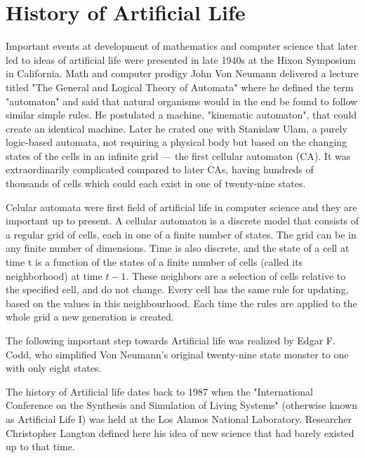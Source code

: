 \documentclass[a4paper,12pt]{report}
\begin{document}
\section{History of Artificial Life}

Important events at development of mathematics and computer science that later led to ideas of artificial life were presented in late 1940s at the Hixon Symposium in California. Math and computer prodigy John Von Neumann delivered a lecture titled "The General and Logical Theory of Automata" where he defined the term "automaton" and said that natural organisms would in the end be found to follow similar simple rules. He postulated a machine, "kinematic automaton", that could create an identical machine. Later he crated one with Stanislaw Ulam, a purely logic-based automata, not requiring a physical body but based on the changing states of the cells in an infinite grid --- the first cellular automaton (CA). It was extraordinarily complicated compared to later CAs, having hundreds of thousands of cells which could each exist in one of twenty-nine states.
 
Celular automata were first field of artificial life in computer science and they are important up to present. A cellular automaton is a discrete model that consists of a regular grid of cells, each in one of a finite number of states. The grid can be in any finite number of dimensions. Time is also discrete, and the state of a cell at time t is a function of the states of a finite number of cells (called its neighborhood) at time $t - 1$. These neighbors are a selection of cells relative to the specified cell, and do not change. Every cell has the same rule for updating, based on the values in this neighbourhood. Each time the rules are applied to the whole grid a new generation is created.\cite{Delorme} 

The following important step towards Artificial life was realized by Edgar F. Codd, who simplified Von Neumann's original twenty-nine state monster to one with only eight states.
 
The history of Artificial life dates back to 1987 when the "International Conference on the Synthesis and Simulation of Living Systems" (otherwise known as Artificial Life I) was held at the Los Alamos National Laboratory. Researcher Christopher Langton defined here his idea of new science that had barely existed up to that time.
 
\end{document}
